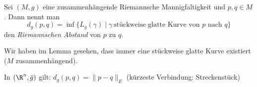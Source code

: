 \begin{defn*}
	Sei $ (M,g) $ eine zusammenhängende Riemannsche Mannigfaltigkeit und $ p,q \in M $. Dann nennt man
	\[ d_g(p,q) = \inf \{L_g(\gamma) \mid \gamma\ \text{stückweise glatte Kurve von $p$ nach $q$} \} \]
	den \emph{Riemannschen Abstand} von $p$ zu $q$.
\end{defn*}

\begin{rem*}
	Wir haben im Lemma gesehen, dass immer eine stückweise glatte Kurve existiert ($M$ zusammenhängend).
\end{rem*}

\begin{rem*}
	In $ (\R^n,\bar{g}) $ gilt: $ d_g(p,q) = \|p-q\|_E $ (kürzeste Verbindung: Streckenstück)
\end{rem*}